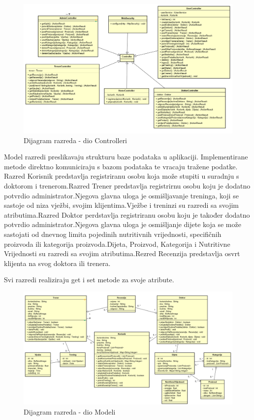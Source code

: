 			\begin{figure}[H]
			\includegraphics[scale=0.65]{dijagrami/Klase/Controlleri.PNG}
			\centering
			\caption{Dijagram razreda - dio Controlleri}
			\label{fig:promjene}
			\end{figure}
			\eject
			Model razredi preslikavaju strukturu baze podataka u aplikaciji. Implementirane metode direktno komuniciraju s bazom podataka te vracaju tražene podatke. Razred Korisnik predstavlja registriranu osobu koja može stupiti u suradnju s doktorom i trenerom.Razred Trener predstavlja registrirnu osobu koju je dodatno potvrdio administrator.Njegova glavna uloga je osmišljavanje treninga, koji se sastoje od niza vježbi, svojim klijentima.Vježbe i treninzi su razredi sa svojim atributima.Razred Doktor perdstavlja registriranu osobu koju je također dodatno potvrdio administrator.Njegova glavna uloga je osmišljanje dijete koja se može sastojati od dnevnog limita pojedinih nutritivnih vrijednosti, specifičnih proizvoda ili kategorija proizvoda.Dijeta, Proizvod, Kategorija i Nutritivne Vrijednosti su razredi sa svojim atributima.Rezred Recenzija predstavlja osvrt klijenta na svog doktora ili trenera.
			
			Svi razredi realiziraju get i set metode za svoje atribute.
			\begin{figure}[H]
			\includegraphics[scale=0.6]{dijagrami/Klase/Modeli.PNG}
			\centering
			\caption{Dijagram razreda - dio Modeli}
			\label{fig:promjene}
			\end{figure}
			\eject
			
